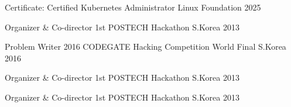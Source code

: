

\begin{cvhonors}

  \cvhonor
    {Certificate: Certified Kubernetes Administrator} %
    {Linux Foundation} %
    {} %
    {2025} %

  \cvhonor
    {Organizer \& Co-director} %
    {1st POSTECH Hackathon} %
    {S.Korea} %
    {2013} %

  \cvhonor
  {Problem Writer} %
  {2016 CODEGATE Hacking Competition World Final} %
  {S.Korea} %
  {2016} %

\cvhonor
  {Organizer \& Co-director} %
  {1st POSTECH Hackathon} %
  {S.Korea} %
  {2013} %

\cvhonor
{Organizer \& Co-director} %
{1st POSTECH Hackathon} %
{S.Korea} %
{2013} %

\end{cvhonors}
